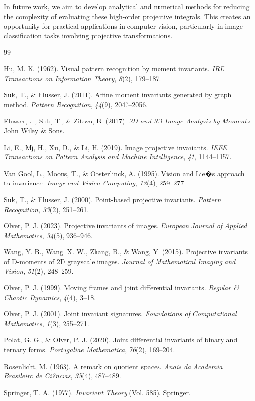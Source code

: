 \documentclass[12pt,reqno]{amsart}
\begin{document}
In future work, we aim to develop analytical and numerical methods for reducing the complexity of evaluating these high-order projective integrals. This creates an opportunity for practical applications in computer vision, particularly in image classification tasks involving projective transformations.



\begin{thebibliography}{99}

Hu, M. K. (1962). Visual pattern recognition by moment invariants. \textit{IRE Transactions on Information Theory}, \textit{8}(2), 179--187.

Suk, T., \& Flusser, J. (2011). Affine moment invariants generated by graph method. \textit{Pattern Recognition}, \textit{44}(9), 2047--2056.

Flusser, J., Suk, T., \& Zitova, B. (2017). \textit{2D and 3D Image Analysis by Moments}. John Wiley \& Sons.

Li, E., Mj, H., Xu, D., \& Li, H. (2019). Image projective invariants. \textit{IEEE Transactions on Pattern Analysis and Machine Intelligence}, \textit{41}, 1144--1157.

Van Gool, L., Moons, T., \& Oosterlinck, A. (1995). Vision and Lie�s approach to invariance. \textit{Image and Vision Computing}, \textit{13}(4), 259--277.

Suk, T., \& Flusser, J. (2000). Point-based projective invariants. \textit{Pattern Recognition}, \textit{33}(2), 251--261.

Olver, P. J. (2023). Projective invariants of images. \textit{European Journal of Applied Mathematics}, \textit{34}(5), 936--946.

Wang, Y. B., Wang, X. W., Zhang, B., \& Wang, Y. (2015). Projective invariants of D-moments of 2D grayscale images. \textit{Journal of Mathematical Imaging and Vision}, \textit{51}(2), 248--259.

Olver, P. J. (1999). Moving frames and joint differential invariants. \textit{Regular \& Chaotic Dynamics}, \textit{4}(4), 3--18.

Olver, P. J. (2001). Joint invariant signatures. \textit{Foundations of Computational Mathematics}, \textit{1}(3), 255--271.

Polat, G. G., \& Olver, P. J. (2020). Joint differential invariants of binary and ternary forms. \textit{Portugaliae Mathematica}, \textit{76}(2), 169--204.

Rosenlicht, M. (1963). A remark on quotient spaces. \textit{Anais da Academia Brasileira de Ci?ncias}, \textit{35}(4), 487--489.

Springer, T. A. (1977). \textit{Invariant Theory} (Vol. 585). Springer.

\end{thebibliography}
\end{document}
